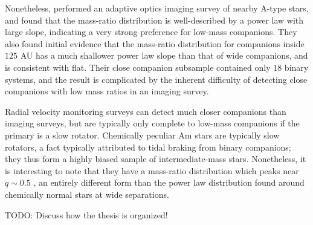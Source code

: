 \documentclass{utthesis}
\begin{document}
Nonetheless, \citet{DeRosa2014} performed an adaptive optics imaging survey of nearby A-type stars, and found that the mass-ratio distribution is well-described by a power law with large slope, indicating a very strong preference for low-mass companions. They also found initial evidence that the mass-ratio distribution for companions inside $125$ AU has a much shallower power law slope than that of wide companions, and is consistent with flat. Their close companion subsample contained only 18 binary systems, and the result is complicated by the inherent difficulty of detecting close companions with low mass ratios in an imaging survey. 

Radial velocity monitoring surveys can detect much closer companions than imaging surveys, but are typically only complete to low-mass companions if the primary is a slow rotator. Chemically peculiar Am stars are typically slow rotators, a fact typically attributed to tidal braking from binary companions; they thus form a highly biased sample of intermediate-mass stars. Nonetheless, it is interesting to note that they have a mass-ratio distribution which peaks near $q \sim 0.5$ \citep{Vuissoz2004}, an entirely different form than the power law distribution found around chemically normal stars at wide separations.

TODO: Discuss how the thesis is organized!





















\end{document}
